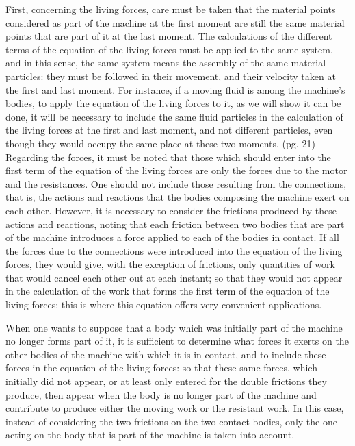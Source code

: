 \documentclass{book}
\begin{document}
First, concerning the living forces, care must be taken that the material points considered as part of the machine at the first moment are still the same material points that are part of it at the last moment. The calculations of the different terms of the equation of the living forces must be applied to the same system, and in this sense, the same system means the assembly of the same material particles: they must be followed in their movement, and their velocity taken at the first and last moment. For instance, if a moving fluid is among the machine's bodies, to apply the equation of the living forces to it, as we will show it can be done, it will be necessary to include the same fluid particles in the calculation of the living forces at the first and last moment, and not different particles, even though they would occupy the same place at these two moments.
\newpage
(pg. 21)\\

Regarding the forces, it must be noted that those which should enter into the first term of the equation of the living forces are only the forces due to the motor and the resistances. One should not include those resulting from the connections, that is, the actions and reactions that the bodies composing the machine exert on each other. However, it is necessary to consider the frictions produced by these actions and reactions, noting that each friction between two bodies that are part of the machine introduces a force applied to each of the bodies in contact. If all the forces due to the connections were introduced into the equation of the living forces, they would give, with the exception of frictions, only quantities of work that would cancel each other out at each instant; so that they would not appear in the calculation of the work that forms the first term of the equation of the living forces: this is where this equation offers very convenient applications.

When one wants to suppose that a body which was initially part of the machine no longer forms part of it, it is sufficient to determine what forces it exerts on the other bodies of the machine with which it is in contact, and to include these forces in the equation of the living forces: so that these same forces, which initially did not appear, or at least only entered for the double frictions they produce, then appear when the body is no longer part of the machine and contribute to produce either the moving work or the resistant work. In this case, instead of considering the two frictions on the two contact bodies, only the one acting on the body that is part of the machine is taken into account.
\end{document}
